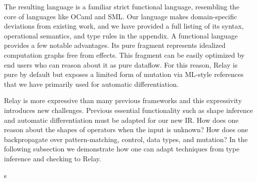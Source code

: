   The resulting language is a familiar strict functional language,
    resembling the core of languages like OCaml and SML.
  Our language makes domain-specific deviations from existing work,
    and we have provided a full listing
    of its syntax, operational semantics, and type rules
    in the appendix.
  A functional language provides a few notable advantages.
  Its pure fragment represents idealized computation graphs free
    from effects. This fragment can be easily optimized by end users who
    can reason about it as pure dataflow.
  For this reason, Relay is pure by default but exposes a limited
    form of mutation via ML-style references that we have
    primarily used for automatic differentiation.

  Relay is more expressive than many previous frameworks and this expressivity introduces new challenges.
    Previous essential functionality such
     as shape inference and automatic differentiation must be adapted for
     our new IR.
  How does one reason about the shapes of operators when the input is unknown?
  How does one backpropagate over pattern-matching, control, data types, and mutation?
  In the following subsection we demonstrate how one can adapt techniques
    from type inference and checking to Relay.


s
